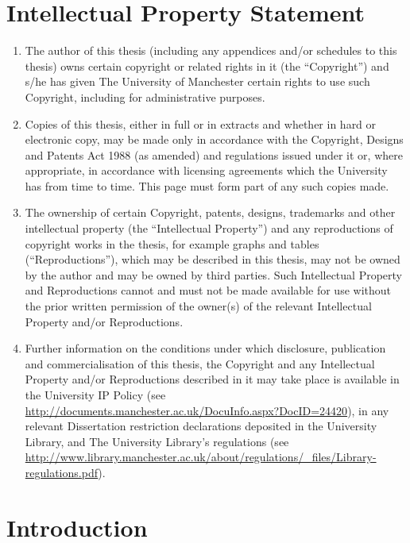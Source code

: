\documentclass[12pt, a4paper]{article}
\begin{document}
\section*{Intellectual Property Statement}
\begin{enumerate}[label=\roman*.]
    \item The author of this thesis (including any appendices and/or schedules to this thesis) owns certain copyright or related rights in it (the ``Copyright'') and s/he has given The University of Manchester certain rights to use such Copyright, including for administrative purposes.
    \item Copies of this thesis, either in full or in extracts and whether in hard or electronic copy, may be made only in accordance with the Copyright, Designs and Patents Act 1988 (as amended) and regulations issued under it or, where appropriate, in accordance with licensing agreements which the University has from time to time. This page must form part of any such copies made.
    \item The ownership of certain Copyright, patents, designs, trademarks and other intellectual property (the ``Intellectual Property'') and any reproductions of copyright works in the thesis, for example graphs and tables (``Reproductions''), which may be described in this thesis, may not be owned by the author and may be owned by third parties. Such Intellectual Property and Reproductions cannot and must not be made available for use without the prior written permission of the owner(s) of the relevant Intellectual Property and/or Reproductions.
    \item Further information on the conditions under which disclosure, publication and commercialisation of this thesis, the Copyright and any Intellectual Property and/or Reproductions described in it may take place is available in the University IP Policy (see \url{http://documents.manchester.ac.uk/DocuInfo.aspx?DocID=24420}), in any relevant Dissertation restriction declarations deposited in the University Library, and The University Library's regulations (see \url{http://www.library.manchester.ac.uk/about/regulations/_files/Library-regulations.pdf}).
\end{enumerate}

\newpage
\tableofcontents

\newpage
\listoffigures
\listoftables

\newpage
{}
\section{Introduction}
\end{document}
